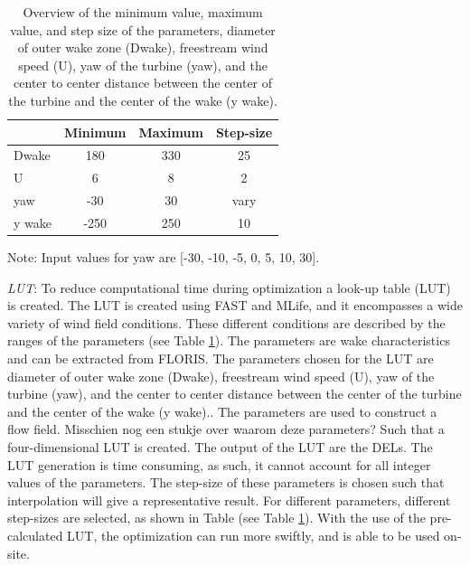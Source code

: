 \begin{table}[h]
	\caption{Overview of the minimum value, maximum value, and step size of the parameters, diameter of outer wake zone (Dwake), freestream wind speed (U), yaw of the turbine (yaw), and the center to center distance between the center of the turbine and the center of the wake (y wake).}
	\centering
	\label{tab:pars}
	\begin{tabular}{lccc}
		\hline
	 	& Minimum & Maximum & Step-size \\ 
		\hline
		Dwake & 180 & 330 & 25 \\
		U & 6 & 8 & 2 \\
		yaw & -30 & 30 & vary \\
		y wake & -250 & 250 & 10 \\
		\hline
	\end{tabular}
Note: Input values for yaw are [-30, -10, -5, 0, 5, 10, 30].
\end{table}

\textit{LUT}: To reduce computational time during optimization a look-up table (LUT) is created. The LUT is created using FAST and MLife, and it encompasses a wide variety of wind field conditions. 
These different conditions are described by the ranges of the parameters (see Table \ref{tab:pars}). The parameters are wake characteristics and can be extracted from FLORIS. The parameters chosen for the LUT are diameter of outer wake zone (Dwake), freestream wind speed (U), yaw of the turbine (yaw), and the center to center distance between the center of the turbine and the center of the wake (y wake).. The parameters are used to construct a flow field. Misschien nog een stukje over waarom deze parameters? Such that a four-dimensional LUT is created. The output of the LUT are the DELs. The LUT generation is time consuming, as such, it cannot account for all integer values of the parameters. The step-size of these parameters is chosen such that interpolation will give a representative result. For different parameters, different step-sizes are selected, as shown in Table (see Table \ref{tab:pars}). With the use of the pre-calculated LUT, the optimization can run more swiftly, and is able to be used on-site.

